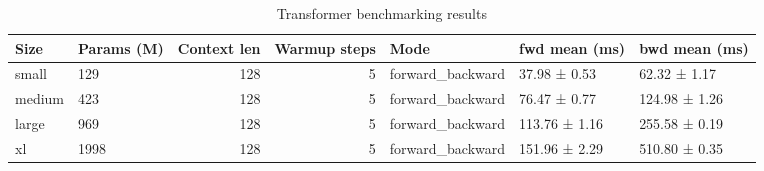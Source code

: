 \begin{table}
\caption{Transformer benchmarking results}
\label{tab:benchmarks}
\begin{tabular}{llrrlll}
\toprule
Size & Params (M) & Context len & Warmup steps & Mode & fwd mean (ms) & bwd mean (ms) \\
\midrule
small & 129 & 128 & 5 & forward_backward & 37.98 ± 0.53 & 62.32 ± 1.17 \\
medium & 423 & 128 & 5 & forward_backward & 76.47 ± 0.77 & 124.98 ± 1.26 \\
large & 969 & 128 & 5 & forward_backward & 113.76 ± 1.16 & 255.58 ± 0.19 \\
xl & 1998 & 128 & 5 & forward_backward & 151.96 ± 2.29 & 510.80 ± 0.35 \\
\bottomrule
\end{tabular}
\end{table}
